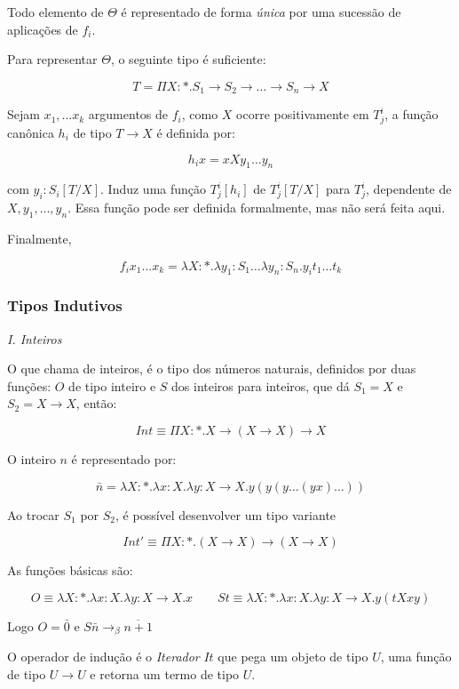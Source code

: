 \documentclass[../main.tex]{subfiles}
\begin{document}
Todo elemento de $\Theta$ é representado de forma \emph{única} por uma sucessão de aplicações de $f_i$.

Para representar $\Theta$, o seguinte tipo é suficiente:

$$T = \Pi X : \ast . S_1 \to S_2 \to \dots \to S_n \to X$$

Sejam $x_1, \dots x_k$ argumentos de $f_i$, como $X$ ocorre positivamente em $T_j^i$, a função canônica $h_i$ de tipo $T \to X$ é definida por:

$$h_i x = x X y_1 \dots y_n$$

com $y_i : S_i[T/X]$. Induz uma função $T_j^i[h_i]$ de $T_j^i[T/X]$ para $T_j^i$, dependente de $X, y_1, \dots, y_n$. Essa função pode ser definida formalmente, mas não será feita aqui.

Finalmente, 

$$f_i x_1 \dots x_k = \lambda X : \ast . \lambda y_1 : S_1 \dots \lambda y_n : S_n . y_i t_1 \dots t_k$$

\subsubsection{Tipos Indutivos}


\emph{I. Inteiros}

O que \cite{girard1989} chama de inteiros, é o tipo dos números naturais, definidos por duas funções: $O$ de tipo inteiro e $S$ dos inteiros para inteiros, que dá $S_1 = X$ e $S_2 = X \to X$, então:

$$Int \equiv \Pi X : \ast . X \to (X \to X) \to X$$

O inteiro $n$ é representado por:

$$\bar{n} = \lambda X : \ast . \lambda x : X . \lambda y : X \to X . y (y (y \dots (y x)\dots))$$

Ao trocar $S_1$ por $S_2$, é possível desenvolver um tipo variante

$$Int' \equiv \Pi X : \ast . (X \to X) \to (X \to X)$$

As funções básicas são:

$$O \equiv \lambda X : \ast . \lambda x : X . \lambda y : X \to X . x \qquad St \equiv \lambda X : \ast . \lambda x : X . \lambda y : X \to X . y(tXxy)$$

Logo $O = \bar{0}$ e $S\bar{n} \to_{\beta} \overline{n + 1}$

O operador de indução é o \emph{Iterador} $It$ que pega um objeto de tipo $U$, uma função de tipo $U \to U$ e retorna um termo de tipo $U$.
\end{document}
